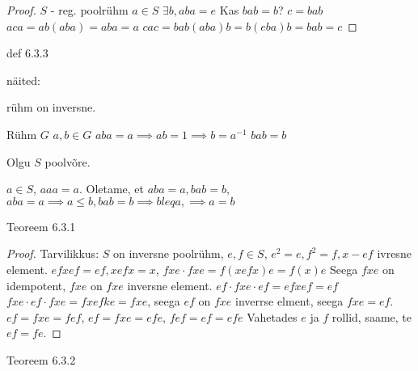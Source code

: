 \documentclass[12pt]{report}
\numberwithin{equation}{section}
\theoremstyle{definition}
\theoremstyle{plain}
\begin{document}
\begin{proof}
$S$ -  reg. poolr\"uhm
$a \in S$
$\exists b, aba = e$
Kas $bab = b$?
$c = bab$
$aca = ab(aba) = aba = a$
$cac = bab(aba)b = b(eba)b = bab = c$
\end{proof}

def 6.3.3

näited:

r\"uhm on inversne. 

R\"uhm $G$
$a,b \in G$
$aba = a \implies ab = 1 \implies b = a ^{-1}$
$bab = b$

Olgu $S$ poolvõre.

$a \in S$, $aaa = a$.
Oletame, et $aba = a, bab = b$, $aba = a \implies a \leq b, bab =b \implies b leq a, \implies a = b$

Teoreem 6.3.1

\begin{proof}
Tarvilikkus: $S$ on inversne poolr\"uhm, $e,f \in S$, $e^2 = e, f^2 = f, x -ef$ ivresne element.
$efxef = ef, xefx = x$,
$fxe \cdot fxe = f(xefx)e = f(x)e$
Seega $fxe$ on idempotent, $fxe$ on $fxe$ inversne element.
$ef \cdot fxe \cdot ef = efxef = ef$
$fxe \cdot ef \cdot fxe = fxefke = fxe$, seega $ef$ on $fxe$ inverrse elment, seega $fxe = ef$. 
$ef = fxe = fef$, $ef = fxe = efe$, $fef=ef=efe$
Vahetades $e$ ja $f$ rollid, saame, te $ef = fe$.
\end{proof}

Teoreem 6.3.2
\end{document}
